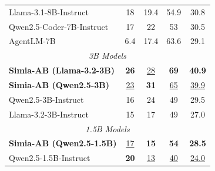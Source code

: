 \begin{table}
{\begin{tabular}{l|ccc|c}
            Llama-3.1-8B-Instruct & 18 & 19.4 & 54.9 & 30.8 \\
            Qwen2.5-Coder-7B-Instruct & 17 & 22 & 53 & 30.5 \\
            AgentLM-7B & 6.4 & 17.4 & 63.6 & 29.1 \\
            \midrule
            \multicolumn{5}{c}{\textit{3B Models}} \\
            \midrule
            \rowcolor{lightblue}
            \textbf{\textcolor{ourmodel}{Simia-AB (Llama-3.2-3B)}} & \textbf{26} & \underline{28} & \textbf{69} & \textbf{40.9} \\
            \rowcolor{lightblue}
            \textbf{\textcolor{ourmodel}{Simia-AB (Qwen2.5-3B)}} & \underline{23} & \textbf{31} & \underline{65} & \underline{39.9} \\
            Qwen2.5-3B-Instruct & 16 & 24 & 49 & 29.5 \\
            Llama-3.2-3B-Instruct & 15 & 17 & 49 & 27.0 \\
            \midrule
            \multicolumn{5}{c}{\textit{1.5B Models}} \\
            \midrule
            \rowcolor{lightblue}
            \textbf{\textcolor{ourmodel}{Simia-AB (Qwen2.5-1.5B)}} & \underline{17} & \textbf{15} & \textbf{54} & \textbf{28.5} \\
            Qwen2.5-1.5B-Instruct & \textbf{20} & \underline{13} & \underline{40} & \underline{24.0} \\
            \bottomrule
        \end{tabular}
    }
\end{table}